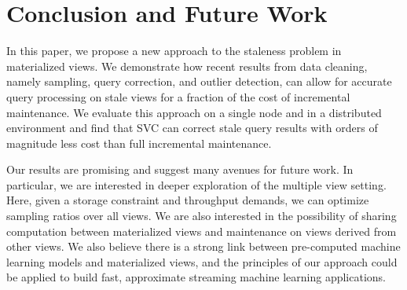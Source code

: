 \vspace{-1em}
\section{Conclusion and Future Work}\label{conclusion}
\vspace{-.3em}
In this paper, we propose a new approach to the staleness problem in materialized views.
We demonstrate how recent results from data cleaning, namely sampling, query correction, and outlier detection, can
allow for accurate query processing on stale views for a fraction of the cost of incremental maintenance. 
We evaluate this approach on a single node and in a distributed environment and find that SVC can correct stale query results 
with orders of magnitude less cost than full incremental maintenance.

Our results are promising and suggest many avenues for future work.
In particular, we are interested in deeper exploration of the multiple view setting.
Here, given a storage constraint and throughput demands, we can optimize sampling ratios over all views.
We are also interested in the possibility of sharing computation between materialized views and maintenance on views derived from other views.
We also believe there is a strong link between pre-computed machine learning models and materialized views, and the principles of our approach could be applied to build fast, approximate streaming machine learning applications.



